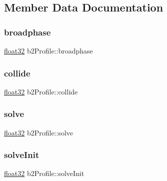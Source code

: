 \subsection{Member Data Documentation}
\mbox{\label{structb2_profile_a6bd556e43a6fa3853adad9fd71e56b44}} 
\subsubsection{\texorpdfstring{broadphase}{broadphase}}
{\footnotesize\ttfamily \mbox{\hyperlink{b2_settings_8h_aacdc525d6f7bddb3ae95d5c311bd06a1}{float32}} b2\+Profile\+::broadphase}

\mbox{\label{structb2_profile_af827d9e54f7a4e94d0a023e18466b960}} 
\subsubsection{\texorpdfstring{collide}{collide}}
{\footnotesize\ttfamily \mbox{\hyperlink{b2_settings_8h_aacdc525d6f7bddb3ae95d5c311bd06a1}{float32}} b2\+Profile\+::collide}

\mbox{\label{structb2_profile_afbefc05f05ec8bfd6cb2011929688a0b}} 
\subsubsection{\texorpdfstring{solve}{solve}}
{\footnotesize\ttfamily \mbox{\hyperlink{b2_settings_8h_aacdc525d6f7bddb3ae95d5c311bd06a1}{float32}} b2\+Profile\+::solve}

\mbox{\label{structb2_profile_a010110900c27ccc88cd5e23b0e12e96e}} 
\subsubsection{\texorpdfstring{solveInit}{solveInit}}
{\footnotesize\ttfamily \mbox{\hyperlink{b2_settings_8h_aacdc525d6f7bddb3ae95d5c311bd06a1}{float32}} b2\+Profile\+::solve\+Init}


